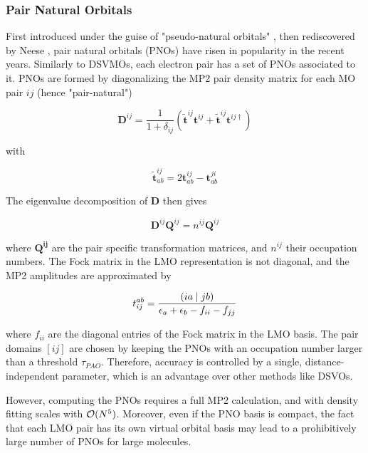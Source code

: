 \subsubsection*{Pair Natural Orbitals}
First introduced under the guise of "pseudo-natural orbitals" \cite{Edm1965}, then rediscovered by Neese \cite{Nee2009a,Nee2009b,Han2011}, pair natural orbitals (PNOs) have risen in popularity in the recent years. Similarly to DSVMOs, each electron pair has a set of PNOs associated to it. PNOs are formed by diagonalizing the MP2 pair density matrix for each MO pair $ij$ (hence "pair-natural")

\begin{equation}
\mathbf{D}^{ij} = \frac{1}{1+\delta_{ij}} \left(\tilde{\mathbf{t}}^{ij} \mathbf{t}^{ij} + \tilde{\mathbf{t}}^{ij} \mathbf{t}^{ij\dagger} \right)
\end{equation}

\noindent with 

\begin{equation}
\mathbf{\tilde{t}}^{ij}_{ab} = 2 \mathbf{t}^{ij}_{ab} - \mathbf{t}^{ji}_{ab} 
\end{equation}

\noindent The eigenvalue decomposition of $\mathbf{D}$ then gives

\begin{equation}
\mathbf{D}^{ij} \mathbf{Q}^{ij} = n^{ij} \mathbf{Q}^{ij} 
\end{equation}

\noindent where $\mathbf{Q^{ij}}$ are the pair specific transformation matrices, and $n^{ij}$ their occupation numbers. The Fock matrix in the LMO representation is not diagonal, and the MP2 amplitudes are approximated by

\begin{equation}
t_{ij}^{ab} = \frac{\left( ia \mid jb \right)}{\epsilon_a + \epsilon_b - f_{ii} - f_{jj}}
\end{equation}

\noindent where $f_{ii}$ are the diagonal entries of the Fock matrix in the LMO basis. The pair domains $[ij]$ are chosen by keeping the PNOs with an occupation number larger than a threshold $\tau_{PAO}$. Therefore, accuracy is controlled by a single, distance-independent parameter, which is an advantage over other methods like DSVOs. 

However, computing the PNOs requires a full MP2 calculation, and with density fitting scales with $\mathcal{O}(N^{5})$. Moreover, even if the PNO basis is compact, the fact that each LMO pair has its own virtual orbital basis may lead to a prohibitively large number of PNOs for large molecules.

